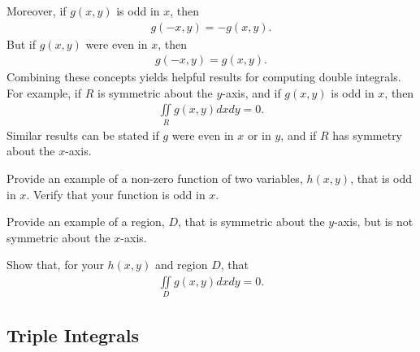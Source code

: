 Moreover, if $g(x,y)$ is odd in $x$, then 
\begin{align*}
  g(-x,y) = - g(x,y).
\end{align*}
But if $g(x,y)$ were even in $x$, then 
\begin{align*}
  g(-x,y) =  g(x,y).
\end{align*}
Combining these concepts yields helpful results for computing double integrals. For example, if $R$ is symmetric about the $y$-axis, and if $g(x,y)$ is odd in $x$, then
\begin{align*}
  \iint\limits_R g(x,y) dxdy = 0.
\end{align*}
Similar results can be stated if $g$ were even in $x$ or in $y$, and if $R$ has symmetry about the $x$-axis. 
\BEN
\item Provide an example of a non-zero function of two variables, $h(x,y)$, that is odd in $x$. Verify that your function is odd in $x$.
\item Provide an example of a region, $D$, that is symmetric about the $y$-axis, but is not symmetric about the $x$-axis. 
\item Show that, for your $h(x,y)$ and region $D$, that 
\begin{align*}
  \iint\limits_D g(x,y) dxdy = 0.
\end{align*}
\EEN

\EEN %
\newpage

\subsection{Triple Integrals}
  
